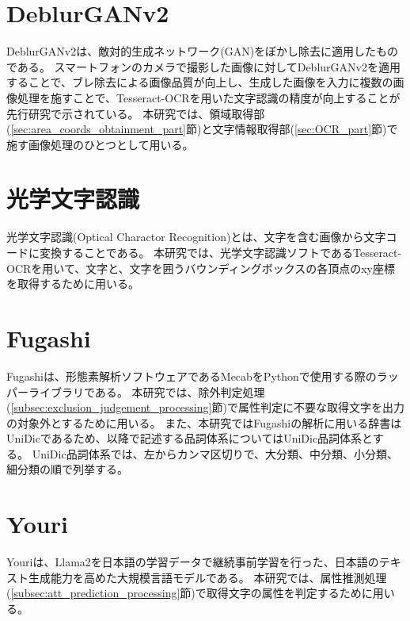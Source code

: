 \section{DeblurGANv2}\label{sec:Deblur-GANv2}
DeblurGANv2は、敵対的生成ネットワーク(GAN)をぼかし除去に適用したものである\cite{DeblurGANv2}。
スマートフォンのカメラで撮影した画像に対してDeblurGANv2を適用することで、ブレ除去による画像品質が向上し、生成した画像を入力に複数の画像処理を施すことで、Tesseract-OCRを用いた文字認識の精度が向上することが先行研究で示されている\cite{DeblurGANv2の先行研究}。
本研究では、領域取得部(\ref{sec:area_coords_obtainment_part}節)と文字情報取得部(\ref{sec:OCR_part}節)で施す画像処理のひとつとして用いる。


\section{光学文字認識}\label{sec:Optical-Charactor-Recognition}
光学文字認識(Optical Charactor Recognition)とは、文字を含む画像から文字コードに変換することである\cite{光学文字認識}。
本研究では、光学文字認識ソフトであるTesseract-OCRを用いて、文字と、文字を囲うバウンディングボックスの各頂点のxy座標を取得するために用いる。


\section{Fugashi}\label{sec:Fugashi}
Fugashiは、形態素解析ソフトウェアであるMecabをPythonで使用する際のラッパーライブラリである\cite{Fugashi}。
本研究では、除外判定処理(\ref{subsec:exclusion_judgement_processing}節)で属性判定に不要な取得文字を出力の対象外とするために用いる。
また、本研究ではFugashiの解析に用いる辞書はUniDicであるため、以降で記述する品詞体系についてはUniDic品詞体系とする。
UniDic品詞体系では、左からカンマ区切りで、大分類、中分類、小分類、細分類の順で列挙する\cite{UniDic品詞体系}。


\section{Youri}\label{sec:Youri}
Youriは、Llama2を日本語の学習データで継続事前学習を行った、日本語のテキスト生成能力を高めた大規模言語モデルである\cite{Youri}。
本研究では、属性推測処理(\ref{subsec:att_prediction_processing}節)で取得文字の属性を判定するために用いる。